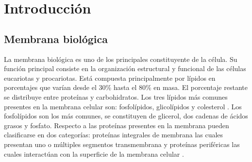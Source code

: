 \chapter{Introducción}{\label{intro}}

\section{Membrana biológica}

La membrana biológica es uno de los principales constituyente de la célula. Su función principal consiste en la organización estructural y funcional de las células eucariotas y procariotas. Está compuesta principalmente por lípidos en porcentajes que varían desde el 30\% hasta el 80\% en masa. El porcentaje restante se distribuye entre proteínas y carbohidratos. Los tres lípidos más comunes presentes en la membrana celular son: fosfolípidos, glicolípidos y colesterol \citep{Ingolfsson2014, Harayama2018}. Los fosfolípidos son los más comunes, se constituyen de glicerol, dos cadenas de ácidos grasos y fosfato. Respecto a las proteínas presentes en la membrana pueden clasificarse en dos categorías: proteínas integrales de membrana las cuales presentan uno o múltiples segmentos transmembrana y proteínas periféricas las cuales interactúan con la superficie de la membrana celular \citep{Phillips2009, Rosenbaum2009, Yeagle2016}.
